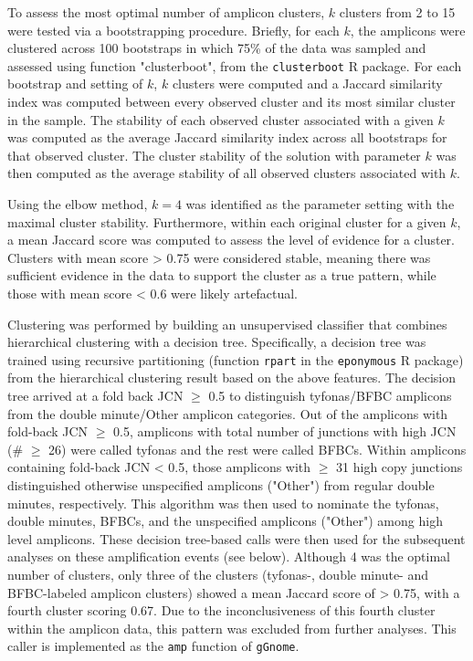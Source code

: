 \documentclass[phd,tocprelim]{cornell}
\newcommand{\ttt}[1]{\texttt{#1}}
\begin{document}

To assess the most optimal number of amplicon clusters, $k$ clusters from 2 to 15 were tested via a bootstrapping procedure.   Briefly, for each $k$, the amplicons were clustered across 100 bootstraps in which 75\% of the data was sampled and assessed using function "clusterboot", from the \texttt{clusterboot} R package. For each bootstrap and setting of $k$, $k$ clusters were computed and a Jaccard similarity index was computed between every observed cluster and its most similar cluster in the sample.  The stability of each observed cluster associated with a given $k$ was computed as the average Jaccard similarity index across all bootstraps for that observed cluster.  The cluster stability of the solution with parameter $k$ was then computed as the average stability of all observed clusters associated with $k$.

Using the elbow method, $k=4$ was identified as the parameter setting with the maximal cluster stability.  Furthermore, within each original cluster for a given $k$, a mean Jaccard score was computed to assess the level of evidence for a cluster. Clusters with mean score > 0.75 were considered stable, meaning there was sufficient evidence in the data to support the cluster as a true pattern, while those with mean score < 0.6 were likely artefactual.

Clustering was performed by building an unsupervised classifier that combines hierarchical clustering with a decision tree.  Specifically, a decision tree was trained using recursive partitioning (function \texttt{rpart} in the \texttt{eponymous} R package) from the hierarchical clustering result based on the above features. The decision tree arrived at a fold back JCN $\ge$ 0.5 to distinguish tyfonas/BFBC amplicons from the double minute/Other amplicon categories. Out of the amplicons with fold-back JCN $\geq$ 0.5, amplicons with total number of junctions with high JCN (\# $\geq$ 26) were called tyfonas and the rest were called BFBCs. Within amplicons containing fold-back JCN < 0.5, those amplicons with $\geq$ 31 high copy junctions distinguished otherwise unspecified amplicons ("Other") from regular double minutes, respectively. This algorithm was then used to nominate the tyfonas, double minutes, BFBCs, and the unspecified amplicons ("Other") among high level amplicons. These decision tree-based calls were then used for the subsequent analyses on these amplification events (see below). Although 4 was the optimal number of clusters, only three of the clusters (tyfonas-, double minute- and BFBC-labeled amplicon clusters) showed a mean Jaccard score of > 0.75, with a fourth cluster scoring 0.67. Due to the inconclusiveness of this fourth cluster within the amplicon data, this pattern was excluded from further analyses. This caller is implemented as the \ttt{amp} function of \ttt{gGnome}.
\end{document}

